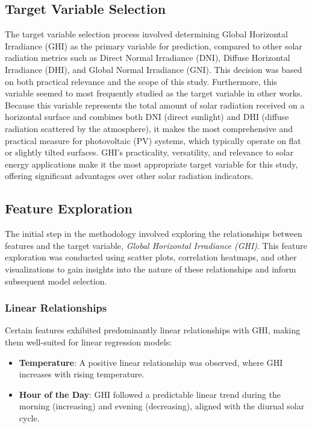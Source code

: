 \documentclass[10pt,twocolumn]{article}
\begin{document}
\begin{itemize}
\subsection{Target Variable Selection}
The target variable selection process involved determining Global Horizontal Irradiance (GHI) as the primary variable for prediction, compared to other solar radiation metrics such as Direct Normal Irradiance (DNI), Diffuse Horizontal Irradiance (DHI), and Global Normal Irradiance (GNI). This decision was based on both practical relevance and the scope of this study. Furthermore, this variable seemed to most frequently studied as the target variable in other works. Because this variable represents the total amount of solar radiation received on a horizontal surface and combines both DNI (direct sunlight) and DHI (diffuse radiation scattered by the atmosphere), it makes the most comprehensive and practical measure for photovoltaic (PV) systems, which typically operate on flat or slightly tilted surfaces.  GHI’s practicality, versatility, and relevance to solar energy applications make it the most appropriate target variable for this study, offering significant advantages over other solar radiation indicators.
\subsection{Feature Exploration}

The initial step in the methodology involved exploring the relationships between features and the target variable, \textit{Global Horizontal Irradiance (GHI)}. This feature exploration was conducted using scatter plots, correlation heatmaps, and other visualizations to gain insights into the nature of these relationships and inform subsequent model selection.

\subsubsection{Linear Relationships}
Certain features exhibited predominantly linear relationships with GHI, making them well-suited for linear regression models:
\begin{itemize}
    \item \textbf{Temperature}: A positive linear relationship was observed, where GHI increases with rising temperature.
    \item \textbf{Hour of the Day}: GHI followed a predictable linear trend during the morning (increasing) and evening (decreasing), aligned with the diurnal solar cycle.
\end{itemize}


\end{itemize}
\end{document}
